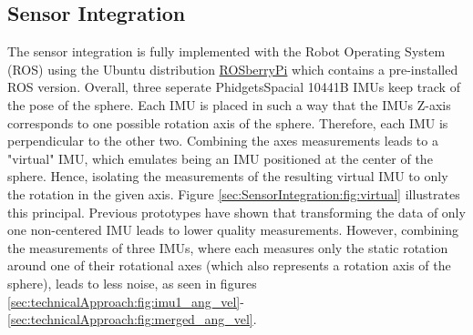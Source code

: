\subsection{Sensor Integration}
\label{sec:TechnicalApproach:sensorintegration}

The sensor integration is fully implemented with the Robot Operating System (ROS) using the Ubuntu distribution \href{http://wiki.ros.org/ROSberryPi}{ROSberryPi} which contains a pre-installed ROS version.
Overall, three seperate PhidgetsSpacial 10441B IMUs \cite{imuphidgets} keep track of the pose of the sphere. Each IMU is placed in such a way that the IMUs Z-axis corresponds to one possible rotation axis of the sphere.
Therefore, each IMU is perpendicular to the other two.
Combining the axes measurements leads to a "virtual" IMU, which emulates being an IMU positioned at the center of the sphere. 
Hence, isolating the measurements of the resulting virtual IMU to only the rotation in the given axis.
Figure \ref{sec:SensorIntegration:fig:virtual} illustrates this principal.
Previous prototypes have shown that transforming the data of only one non-centered IMU leads to lower quality measurements.
However, combining the measurements of three IMUs, where each measures only the static rotation around one of their rotational axes (which also represents a rotation axis of the sphere), leads to less noise, as seen in figures  \ref{sec:technicalApproach:fig:imu1_ang_vel}-\ref{sec:technicalApproach:fig:merged_ang_vel}.

